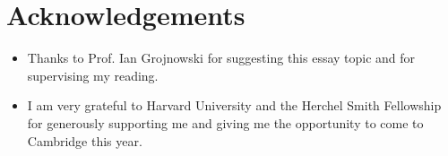 \section*{Acknowledgements}

\begin{itemize}[leftmargin=*]
\item Thanks to Prof. Ian Grojnowski for suggesting this essay topic and for supervising my reading.
\item I am very grateful to Harvard University and the Herchel Smith Fellowship for generously supporting me and giving me the opportunity to come to Cambridge this year.
\end{itemize}
